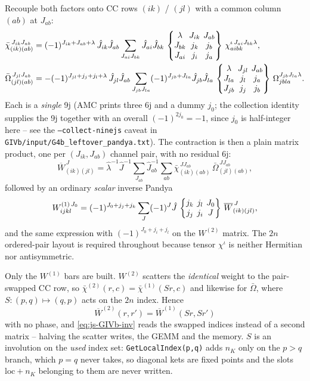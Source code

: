 \documentclass[enabledeprecatedfontcommands]{scrartcl}
\newcommand{\codename}[1]{\texttt{#1}}
\newcommand{\sixj}[6]{\begingroup\setlength{\arraycolsep}{0.2em}%
  \begin{Bmatrix} #1 & #2 & #3 \\ #4 & #5 & #6 \end{Bmatrix}\endgroup}
\newcommand{\ninej}[9]{\begingroup\setlength{\arraycolsep}{0.2em}%
  \begin{Bmatrix} #1 & #2 & #3 \\ #4 & #5 & #6 \\ #7 & #8 & #9 \end{Bmatrix}\endgroup}
\begin{document}
Recouple both factors onto CC rows $(ik)$ / $(jl)$ with a common
column $(ab)$ at $J_{ab}$:
\begin{equation}\label{eq:js-GIVb-bars}
\begin{aligned}
\bar\chi^{\,J_{ik}J_{ab}}_{(ik)(ab)}
&=
(-1)^{J_{ik}+J_{ab}+\lambda}\,\hat J_{ik}\hat J_{ab}
\sum_{J_{ai}J_{bk}}\hat J_{ai}\hat J_{bk}\,
\ninej{\lambda}{J_{ik}}{J_{ab}}{J_{bk}}{j_k}{j_b}{J_{ai}}{j_i}{j_a}\,
\chi^{\iota\,J_{ai}J_{bk}\lambda}_{aibk},
\\
\bar\Omega^{\,J_{jl}J_{ab}}_{(jl)(ab)}
&=
-(-1)^{J_{jl}+j_j+j_l+\lambda}\,\hat J_{jl}\hat J_{ab}
\sum_{J_{jb}J_{la}}(-1)^{J_{jb}+J_{la}}\hat J_{jb}\hat J_{la}\,
\ninej{\lambda}{J_{jl}}{J_{ab}}{J_{la}}{j_l}{j_a}{J_{jb}}{j_j}{j_b}\,
\Omega^{J_{jb}J_{la}\lambda}_{jbla}.
\end{aligned}
\end{equation}
Each is a \emph{single} 9j (AMC prints three 6j and a dummy $j_0$;
the collection identity supplies the 9j together with an overall
$(-1)^{2j_0}=-1$, since $j_0$ is half-integer here -- see the
\codename{--collect-ninejs} caveat in
\codename{GIVb/input/G4b\_leftover\_pandya.txt}).
The contraction is then a plain matrix product, one per
$(J_{ik},J_{ab})$ channel pair, with no residual 6j:
\begin{equation}\label{eq:js-GIVb-gemm}
\overline W^{\,J}_{(ik)(jl)}
=
\hat\lambda^{-1}\hat J^{-1}
\sum_{J_{ab}}\hat J_{ab}^{-1}
\sum_{ab}
\bar\chi^{\,J J_{ab}}_{(ik)(ab)}\,
\bar\Omega^{\,J J_{ab}}_{(jl)(ab)},
\end{equation}
followed by an ordinary \emph{scalar} inverse Pandya
\begin{equation}\label{eq:js-GIVb-inv}
W^{(1)\,J_0}_{ijkl}
=
(-1)^{J_0+j_j+j_k}
\sum_{J}(-1)^{J}\hat J\,
\sixj{j_k}{j_l}{J_0}{j_j}{j_i}{J}\,
\overline W^{\,J}_{(ik)(jl)},
\end{equation}
and the same expression with $(-1)^{J_0+j_i+j_l}$ on the $W^{(2)}$
matrix. The $2n$ ordered-pair layout is required throughout because
tensor $\chi^\iota$ is neither Hermitian nor antisymmetric.

Only the $W^{(1)}$ bars are built. $W^{(2)}$ scatters the
\emph{identical} weight to the pair-swapped CC row, so
$\bar\chi^{(2)}(r,c)=\bar\chi^{(1)}(Sr,c)$ and likewise for
$\bar\Omega$, where $S:(p,q)\mapsto(q,p)$ acts on the $2n$ index.
Hence
\begin{equation}\label{eq:js-GIVb-sym}
\overline W^{(2)}(r,r')=\overline W^{(1)}(Sr,Sr')
\end{equation}
with no phase, and \eqref{eq:js-GIVb-inv} reads the swapped indices
instead of a second matrix -- halving the scatter writes, the GEMM and
the memory. $S$ is an involution on the \emph{used} index set:
\codename{GetLocalIndex(p,q)} adds $n_K$ only on the $p>q$ branch,
which $p=q$ never takes, so diagonal kets are fixed points and the
slots $\mathrm{loc}+n_K$ belonging to them are never written.
\end{document}
